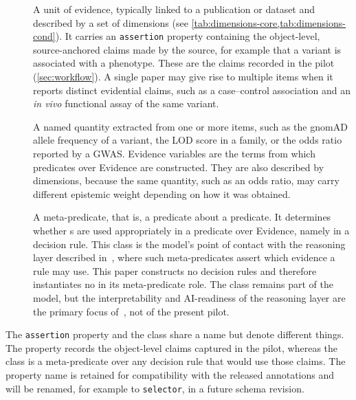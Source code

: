 \begin{description}
    \item[\ScientificEvidence] A unit of evidence, typically linked to a
          publication or dataset and described by a set of dimensions (see
          \cref{tab:dimensions-core,tab:dimensions-cond}). It carries an
          \texttt{assertion} property containing the object-level,
          source-anchored claims made by the source, for example that a
          variant is associated with a phenotype. These are the claims
          recorded in the pilot (\cref{sec:workflow}). A single paper may
          give rise to multiple \ScientificEvidence{} items when it reports
          distinct evidential claims, such as a case--control association and
          an \emph{in vivo} functional assay of the same variant.
    \item[\EvidenceVariable] A named quantity extracted from one or more
        \ScientificEvidence{} items, such as the gnomAD allele frequency of
        a variant, the LOD score in a family, or the odds ratio reported by
        a GWAS. Evidence variables are the terms from which predicates over
        Evidence are constructed. They are also described by dimensions,
        because the same quantity, such as an odds ratio, may carry different
        epistemic weight depending on how it was obtained.
    \item[\EvidenceAssertion] A meta-predicate, that is, a predicate about a
        predicate. It determines whether \EvidenceVariable{}s are used
        appropriately in a predicate over Evidence, namely in a decision
        rule. This class is the model's point of contact with the reasoning
        layer described in~\cite{our_preprint}, where such meta-predicates
        assert which evidence a rule may use. This paper constructs no decision rules and therefore instantiates no
        \EvidenceAssertion{} in its meta-predicate role. The class remains part of
        the model, but the interpretability and AI-readiness of the reasoning layer
        are the primary focus of~\cite{our_preprint}, not of the present pilot.
\end{description}

The \texttt{assertion} property and the \EvidenceAssertion{} class share
a name but denote different things. The property records the object-level
claims captured in the pilot, whereas the class is a meta-predicate over
any decision rule that would use those claims. The property name is
retained for compatibility with the released annotations and will be
renamed, for example to \texttt{selector}, in a future schema revision.

